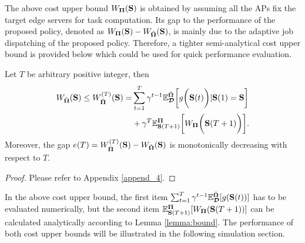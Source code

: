The above cost upper bound $W_{\boldsymbol{\Pi}}(\mathbf{S})$ is obtained by assuming all the APs fix the target edge servers for task computation.
Its gap to the performance of the proposed policy, denoted as $W_{\boldsymbol{\Pi}}(\mathbf{S}) - W_{\tilde{\boldsymbol{\Omega}}}(\mathbf{S})$, is mainly due to the adaptive job dispatching of the proposed policy.
Therefore, a tighter semi-analytical cost upper bound is provided below which could be used for quick performance evaluation.
\begin{lemma}
    Let $T$ be arbitrary positive integer, then
    {\small
    \begin{align}
        W_{\tilde{\boldsymbol{\Omega}}}(\mathbf{S}) \leq W_{\hat{\boldsymbol{\Pi}}}^{(T)}(\mathbf{S})
        = &\sum_{t=1}^{T} \gamma^{t-1} \mathbb{E}^{\tilde{\boldsymbol{\Omega}}}_{\boldsymbol{\mathcal{D}}}\bigg[g\bigg(\mathbf{S}(t)\bigg) | \mathbf{S}(1)=\mathbf{S}\bigg]
        \\\nonumber
        &+\gamma^{T} \mathbb{E}^{\boldsymbol{\Pi}}_{\mathbf{S}(T+1)}\bigg[W_{\boldsymbol{\Pi}}\bigg(\mathbf{S}(T+1)\bigg)\bigg].
        \label{eqn:semi-bound}
    \end{align}
    }%
    Moreover, the gap $e(T) = W^{(T)}_{\hat{\boldsymbol{\Pi}}}(\mathbf{S}) - W_{\tilde{\boldsymbol{\Omega}}}(\mathbf{S})$ is monotonically decreasing with respect to $T$.
    \label{lemma:semi-bound}
\end{lemma}
\begin{proof}
    Please refer to Appendix \ref{append_4}.
\end{proof}
In the above cost upper bound, the first item $\sum_{t=1}^{T} \gamma^{t-1} \mathbb{E}^{\tilde{\boldsymbol{\Omega}}}_{\boldsymbol{\mathcal{D}}}[g(\mathbf{S}(t))]$ has to be evaluated numerically, but the second item $\mathbb{E}^{\boldsymbol{\Pi}}_{\mathbf{S}(T+1)}[{W_{\boldsymbol{\Pi}}(\mathbf{S}(T+1))}]$ can be calculated analytically according to Lemma \ref{lemma:bound}.
The performance of both cost upper bounds will be illustrated in the following simulation section.

